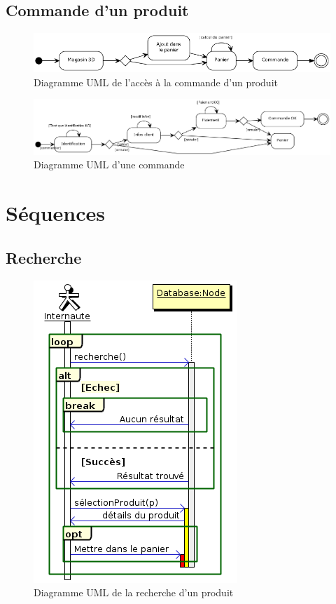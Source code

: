 \documentclass[12pt]{article}
\begin{document}
\subsection{Commande d'un produit}

\begin{figure}[ht]
    \center
    \includegraphics[scale=0.55]{../Diagrams/ActivityDiagrams/commande_global.png}
    \caption*{Diagramme UML de l'accès à la commande d'un produit}
\end{figure}

\begin{figure}[ht]
    \center
    \includegraphics[scale=0.45]{../Diagrams/ActivityDiagrams/commande_en_cours.png}
    \caption*{Diagramme UML d'une commande}
\end{figure}

\newpage
\section{Séquences}

\subsection{Recherche}

\begin{figure}[ht]
    \center
    \includegraphics[scale=0.6]{../Diagrams/SequenceDiagrams/recherche.png}
    \caption*{Diagramme UML de la recherche d'un produit}
\end{figure}
\end{document}
